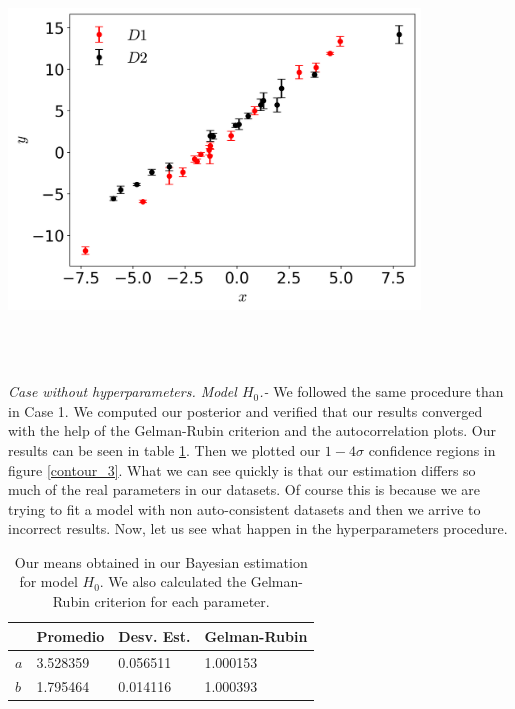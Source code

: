 \documentclass[onecolumn,           %
               showpacs,            %
               preprintnumbers,     %
               aps,                 %
               prl,          	    %
               letterpaper,             %
               superscriptaddress,      %
               nofootinbib,         %
               tightenlines,        %
               floats,floatfix      %
               ,usenatbib,
               ]{revtex4-1}
\begin{document}
\begin{minipage}{\textwidth}
\centering
\includegraphics[height=8cm]{Figures/data_2.png}
\label{data_2}
\end{minipage}\\ $ $

\textit{Case without hyperparameters. Model $H_0$.-} We followed the same procedure than in Case 1. We computed our posterior and verified that our results converged with the help of the Gelman-Rubin criterion and the autocorrelation plots. Our results can be seen in table \ref{tab2}. Then we plotted our $1-4 \sigma$ confidence regions in figure \ref{contour_3}. What we can see quickly is that our estimation differs so much of the real parameters in our datasets. Of course this is because we are trying to fit a model with non auto-consistent datasets and then we arrive to incorrect results. Now, let us see what happen in the hyperparameters procedure.    

\begin{table}[h!]
\centering
\begin{tabular}{||l|l|l|l||} 
 \hline
 & \textbf{Promedio} & \textbf{Desv. Est.} & \textbf{Gelman-Rubin} \\ [0.5ex] 
 \hline\hline
$a$ & 3.528359 	 & 0.056511 & 1.000153 \\
\hline
$b$ & 1.795464 & 0.014116 	 	 & 1.000393\\ [1ex] 
 \hline
\end{tabular}
\caption{\footnotesize{Our means obtained in our Bayesian estimation for model $H_0$. We also calculated the Gelman-Rubin criterion for each parameter.}}
\label{tab2}
\end{table}
\end{document}
